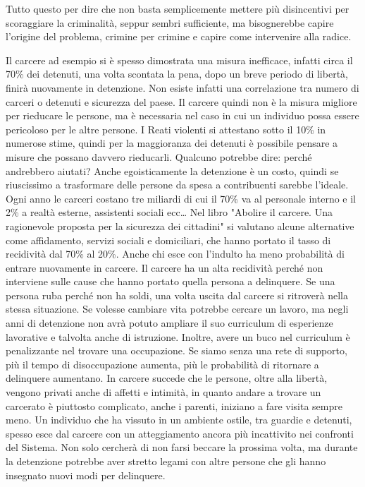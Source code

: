 \documentclass[12pt]{book} %
\begin{document}
Tutto questo per dire che non basta semplicemente mettere più disincentivi per scoraggiare la criminalità, seppur sembri sufficiente, ma bisognerebbe capire l'origine del problema, crimine per crimine e capire come intervenire alla radice.

Il carcere ad esempio si è spesso dimostrata una misura inefficace, infatti circa il 70\% dei detenuti, una volta scontata la pena, dopo un breve periodo di libertà, finirà nuovamente in detenzione. Non esiste infatti una correlazione tra numero di carceri o detenuti e sicurezza del paese. Il carcere quindi non è la misura migliore per rieducare le persone, ma è necessaria nel caso in cui un individuo possa essere pericoloso per le altre persone.
I Reati violenti si attestano sotto il 10\% in numerose stime, quindi per la maggioranza dei detenuti è possibile pensare a misure che possano davvero rieducarli.
Qualcuno potrebbe dire: perché andrebbero aiutati? Anche egoisticamente la detenzione è un costo, quindi se riuscissimo a trasformare delle persone da spesa a contribuenti sarebbe l'ideale. Ogni anno le carceri costano tre miliardi di cui il 70\% va al personale interno e il 2\% a realtà esterne,
assistenti sociali ecc…
Nel libro "Abolire il carcere. Una ragionevole proposta per la sicurezza dei cittadini"  si valutano alcune alternative come affidamento, servizi sociali e domiciliari, che hanno portato il tasso
di recidività dal 70\% al 20\%. Anche chi esce con l'indulto ha meno probabilità di entrare nuovamente in carcere. 
Il carcere ha un alta recidività perché non interviene sulle cause che hanno portato quella persona a delinquere.
Se una persona ruba perché non ha soldi, una volta uscita dal carcere si ritroverà nella stessa situazione.
Se volesse cambiare vita potrebbe cercare un lavoro, ma negli anni di detenzione non avrà potuto ampliare il suo curriculum di esperienze lavorative e talvolta anche di istruzione. Inoltre, avere un buco nel curriculum è penalizzante nel trovare una occupazione. 
Se siamo senza una rete di supporto, più il tempo di disoccupazione aumenta, più le probabilità di ritornare a delinquere aumentano.
In carcere succede che le persone, oltre alla libertà, vengono privati anche di affetti e intimità, in quanto andare
a trovare un carcerato è piuttosto complicato, anche i parenti, iniziano a fare visita sempre meno. 
Un individuo che ha vissuto in un ambiente ostile, tra guardie e detenuti, spesso esce dal carcere con un atteggiamento ancora più incattivito nei confronti del Sistema. Non solo cercherà di non farsi beccare la prossima volta, ma durante la detenzione potrebbe aver stretto legami con altre persone che gli hanno insegnato nuovi modi per delinquere.
\end{document}
